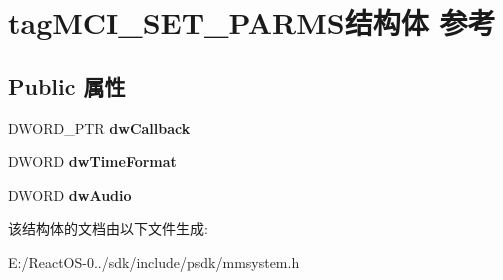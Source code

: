 \hypertarget{structtag_m_c_i___s_e_t___p_a_r_m_s}{}\section{tag\+M\+C\+I\+\_\+\+S\+E\+T\+\_\+\+P\+A\+R\+M\+S结构体 参考}
\label{structtag_m_c_i___s_e_t___p_a_r_m_s}
\subsection*{Public 属性}
\begin{DoxyCompactItemize}
\item 
\mbox{\label{structtag_m_c_i___s_e_t___p_a_r_m_s_aa13b9dbcf849b3c3f636c886d0980d0c}} 
D\+W\+O\+R\+D\+\_\+\+P\+TR {\bfseries dw\+Callback}
\item 
\mbox{\label{structtag_m_c_i___s_e_t___p_a_r_m_s_ab1bf642b542c7c5811e75bfef6d71f65}} 
D\+W\+O\+RD {\bfseries dw\+Time\+Format}
\item 
\mbox{\label{structtag_m_c_i___s_e_t___p_a_r_m_s_a7a73fc0f8cbb5ddcb0b4b129fcf474a8}} 
D\+W\+O\+RD {\bfseries dw\+Audio}
\end{DoxyCompactItemize}


该结构体的文档由以下文件生成\+:\begin{DoxyCompactItemize}
\item 
E\+:/\+React\+O\+S-\/0../sdk/include/psdk/mmsystem.\+h\end{DoxyCompactItemize}
